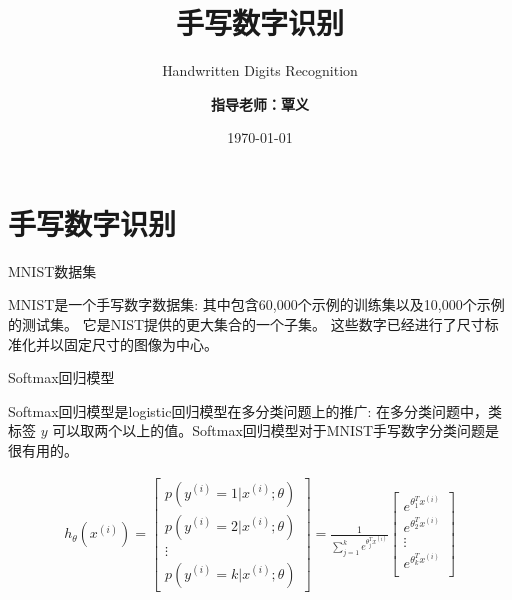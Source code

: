 \documentclass[newPxFont,sthlmFooter]{beamer}
\title{手写数字识别}
\subtitle{Handwritten Digits Recognition}
\author{\textbf{指导老师：覃义}}
\institute{\textbf{唐呈俊 刘宇豪 黄增玉 金梦雨}}
\date{\today}
\begin{document}
%
%

\maketitle


%
%

\section*{手写数字识别}


\begin{frame}[c]{MNIST数据集}

\begin{block}{MNIST是一个手写数字数据集:}
	其中包含60,000个示例的训练集以及10,000个示例的测试集。 它是NIST提供的更大集合的一个子集。 这些数字已经进行了尺寸标准化并以固定尺寸的图像为中心。
\end{block}

\end{frame}

\begin{frame}[c]{Softmax回归模型}

\begin{block}{Softmax回归模型是logistic回归模型在多分类问题上的推广:}
	在多分类问题中，类标签 $y$ 可以取两个以上的值。Softmax回归模型对于MNIST手写数字分类问题是很有用的。
\end{block}
\begin{align*}
h_\theta(x^{(i)}) =
\begin{bmatrix}
p(y^{(i)} = 1 | x^{(i)}; \theta) \\
p(y^{(i)} = 2 | x^{(i)}; \theta) \\
\vdots \\
p(y^{(i)} = k | x^{(i)}; \theta)
\end{bmatrix}
=
\frac{1}{ \sum_{j=1}^{k}{e^{ \theta_j^T x^{(i)} }} }
\begin{bmatrix}
e^{ \theta_1^T x^{(i)} } \\
e^{ \theta_2^T x^{(i)} } \\
\vdots \\
e^{ \theta_k^T x^{(i)} } \\
\end{bmatrix}
\end{align*}

\end{frame}
\end{document}
